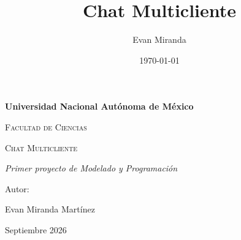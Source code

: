 \documentclass{article}
\title{Chat Multicliente}
\author{Evan Miranda}
\date{\today}
\begin{document}
\begin{titlepage}
\centering
{\bfseries\LARGE Universidad Nacional Autónoma de México \par}
\vspace{1cm}
{\scshape\Large Facultad de Ciencias \par}
\vspace{3cm}
{\scshape\Huge Chat Multicliente \par}
\vspace{3cm}
{\itshape\Large Primer proyecto de Modelado y Programación \par}
\vfill
{\Large Autor: \par}
{\Large Evan Miranda Martínez \par}
\vfill
{\Large Septiembre 2026 \par}
\end{titlepage}

 
 
 
 
 

\nocite{*}
\printbibliography 
\end{document}

